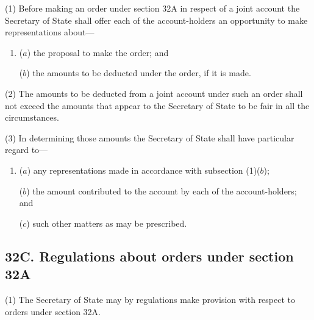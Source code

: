 \documentclass[12pt,a4paper]{article}
\begin{document}
(1) Before making an order under section 32A in respect of a joint account 
the Secretary of State shall offer each of the account-holders an opportunity to make representations about---
\begin{enumerate}\item[]
($a$) the proposal to make the order; and

($b$) the amounts to be deducted under the order, if it is made.
\end{enumerate}

(2)
The amounts to be deducted from a joint account under such an order shall not exceed the amounts that appear to the Secretary of State to be fair in all the circumstances.

(3)
In determining those amounts the Secretary of State shall have particular regard to---
\begin{enumerate}\item[]
($a$) any representations made in accordance with subsection (1)($b$);

($b$) the amount contributed to the account by each of the account-holders; and

($c$) such other matters as may be prescribed.
\end{enumerate}


\subsection{32C. Regulations about orders under section 32A}

(1) The Secretary of State may by regulations make provision with respect
to orders under section 32A.
\end{document}
